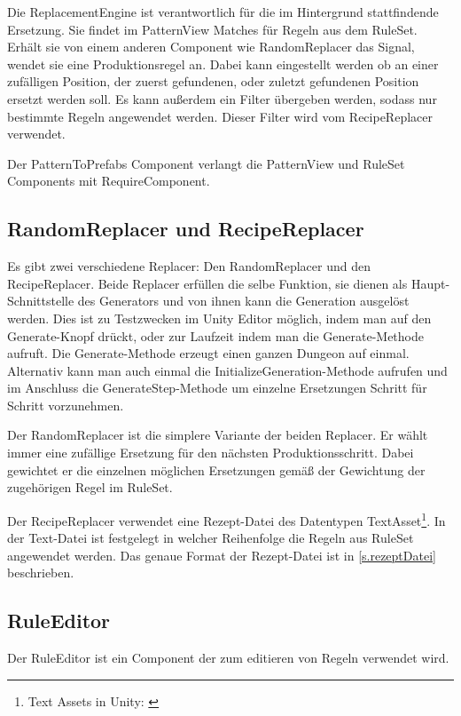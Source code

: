 Die ReplacementEngine ist verantwortlich für die im Hintergrund stattfindende Ersetzung. Sie findet im PatternView Matches für Regeln aus dem RuleSet. Erhält sie von einem anderen Component wie RandomReplacer das Signal, wendet sie eine Produktionsregel an. Dabei kann eingestellt werden ob an einer zufälligen Position, der zuerst gefundenen, oder zuletzt gefundenen Position ersetzt werden soll. Es kann außerdem ein Filter übergeben werden, sodass nur bestimmte Regeln angewendet werden. Dieser Filter wird vom RecipeReplacer verwendet.

Der PatternToPrefabs Component verlangt die PatternView und RuleSet Components mit RequireComponent.

\subsection{RandomReplacer und RecipeReplacer}\label{ss.replacers}

Es gibt zwei verschiedene Replacer: Den RandomReplacer und den RecipeReplacer. Beide Replacer erfüllen die selbe Funktion, sie dienen als Haupt-Schnittstelle des Generators und von ihnen kann die Generation ausgelöst werden. Dies ist zu Testzwecken im Unity Editor möglich, indem man auf den Generate-Knopf drückt, oder zur Laufzeit indem man die Generate-Methode aufruft. Die Generate-Methode erzeugt einen ganzen Dungeon auf einmal. Alternativ kann man auch einmal die InitializeGeneration-Methode aufrufen und im Anschluss die GenerateStep-Methode um einzelne Ersetzungen Schritt für Schritt vorzunehmen.

Der RandomReplacer ist die simplere Variante der beiden Replacer. Er wählt immer eine zufällige Ersetzung für den nächsten Produktionsschritt. Dabei gewichtet er die einzelnen möglichen Ersetzungen gemäß der Gewichtung der zugehörigen Regel im RuleSet.

Der RecipeReplacer verwendet eine Rezept-Datei des Datentypen TextAsset\footnote{Text Assets in Unity: \cite[Seite: class-TextAsset]{unityManual}}. In der Text-Datei ist festgelegt in welcher Reihenfolge die Regeln aus RuleSet angewendet werden. Das genaue Format der Rezept-Datei ist in \ref{s.rezeptDatei} beschrieben.

\subsection{RuleEditor}\label{ss.ruleEditor}

Der RuleEditor ist ein Component der zum editieren von Regeln verwendet wird. 

